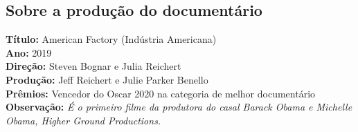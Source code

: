 \documentclass[12pt,a4paper,oneside]{article}
\begin{document}
\cleardoublepage        %
\setcounter{page}{1}    %


\begin{onehalfspace}

\section{Sobre a produção do documentário}

\textbf{Título:} American Factory (Indústria Americana)\\
\textbf{Ano:} 2019 \\
\textbf{Direção:} Steven Bognar e Julia Reichert \\
\textbf{Produção:} Jeff Reichert e Julie Parker Benello \\
\textbf{Prêmios:} Vencedor do Oscar 2020 na categoria de melhor documentário \\
\textbf{Observação:}  \textit{É o primeiro filme da produtora do casal Barack Obama e Michelle Obama, Higher Ground Productions.
}


\end{onehalfspace}
\end{document}
